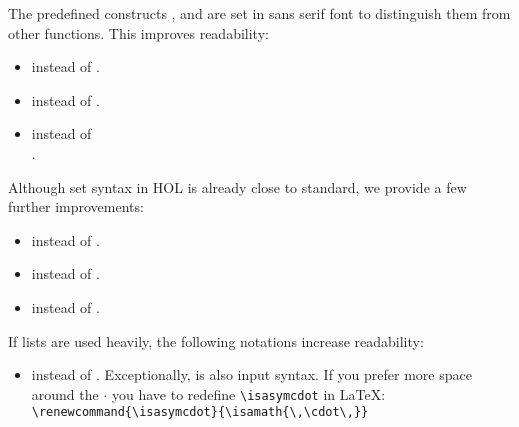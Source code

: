 \begin{isabellebody}
\begin{isamarkuptext}
The predefined constructs ,  and
 are set in sans serif font to distinguish them from
other functions. This improves readability:
\begin{itemize}
\item {} instead of .
\item {} instead of .
\item {} instead of\\
      .
\end{itemize}%
\end{isamarkuptext}%
\isamarkuptrue%
%
\isamarkuptrue%
%
\begin{isamarkuptext}%
Although set syntax in HOL is already close to
standard, we provide a few further improvements:
\begin{itemize}
\item {} instead of .
\item \isa{{\isasymemptyset}} instead of \isa{{\isacharbraceleft}{\isacharbraceright}}.
\item {} instead of .
\end{itemize}%
\end{isamarkuptext}%
\isamarkuptrue%
%
\isamarkuptrue%
%
\begin{isamarkuptext}%
If lists are used heavily, the following notations increase readability:
\begin{itemize}
\item {} instead of .
      Exceptionally,  is also input syntax.
If you prefer more space around the $\cdot$ you have to redefine
\verb!\isasymcdot! in \LaTeX:
\verb!\renewcommand{\isasymcdot}{\isamath{\,\cdot\,}}!


\end{itemize}
\end{isamarkuptext}
\end{isabellebody}
